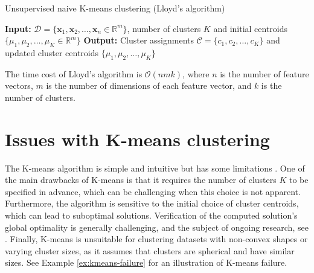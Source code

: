 \documentclass{article}[11pt]
\newcommand{\norm}[1]{\left|\left|#1\right|\right|}
\DeclareMathOperator*{\argmin}{arg\,min}
\begin{document}
\begin{algorithm}[H]
   \begin{algorithmic}
   \caption{Unsupervised naive K-means clustering (Lloyd's algorithm)}\label{alg:kmeans}
   \State \textbf{Input:} $\mathcal{D} = \{\mathbf{x}_1, \mathbf{x}_2, \ldots, \mathbf{x}_n\in\mathbb{R}^{m}\}$, number of clusters $K$ and initial centroids $\{\mu_1, \mu_2, \ldots, \mu_K\in\mathbb{R}^{m}\}$
   \State \textbf{Output:} Cluster assignments $\mathcal{C} = \{c_1, c_2, \ldots, c_K\}$ and updated cluster centroids $\{\mu_1, \mu_2, \ldots, \mu_K\}$
      \State{$c_{i}\gets\argmin_{j} \norm{\mathbf{x} - \mu_j}^2$}
   \EndFor 
   \Statex
   \State{$\hat{\mu}\gets\mu$}
   \EndFor
   \Statex
   \If{$\norm{\mu - \hat{\mu}} < \epsilon$}
   \EndIf
   \EndWhile
   \end{algorithmic}
\end{algorithm}
The time cost of Lloyd’s algorithm is $\mathcal{O}(nmk)$, where $n$ is the number of feature vectors, $m$ is the number of dimensions of each feature vector,
and $k$ is the number of clusters.

\section{Issues with K-means clustering}
The K-means algorithm is simple and intuitive but has some limitations \citep{Raykov:2016aa}.
One of the main drawbacks of K-means is that it requires the number of clusters $K$ to be specified in advance, which can be challenging when this choice is not apparent.
Furthermore, the algorithm is sensitive to the initial choice of cluster centroids, which can lead to suboptimal solutions.
Verification of the computed solution's global optimality is generally challenging, and the subject of ongoing research, see \citep{Peng:2007, Iguchi:2016, Clum:2022}.
Finally, K-means is unsuitable for clustering datasets with non-convex shapes or varying cluster sizes, as it assumes that clusters are spherical and have similar sizes.
See Example \ref{ex:kmeans-failure} for an illustration of K-means failure.
\end{document}
